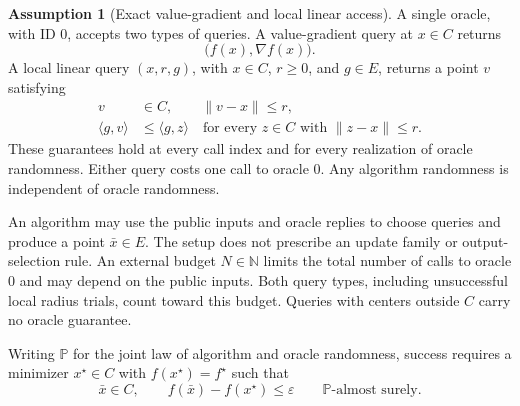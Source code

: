 \documentclass[10pt]{article}
\theoremstyle{definition}
\newtheorem{assumption}{Assumption}
\begin{document}
\begin{assumption}[Exact value-gradient and local linear access]
A single oracle, with ID $0$, accepts two types of queries. A value-gradient query at $x\in C$ returns
\[
\bigl(f(x),\nabla f(x)\bigr).
\]
A local linear query $(x,r,g)$, with $x\in C$, $r\geq0$, and $g\in E$, returns a point $v$ satisfying
\begin{align*}
v&\in C, \qquad \|v-x\|\leq r,\\
\langle g,v\rangle&\leq\langle g,z\rangle
\quad\text{for every }z\in C\text{ with }\|z-x\|\leq r.
\end{align*}
These guarantees hold at every call index and for every realization of oracle randomness. Either query costs one call to oracle $0$. Any algorithm randomness is independent of oracle randomness.
\end{assumption}

An algorithm may use the public inputs and oracle replies to choose queries and produce a point $\bar{x}\in E$. The setup does not prescribe an update family or output-selection rule. An external budget $N\in\mathbb{N}$ limits the total number of calls to oracle $0$ and may depend on the public inputs. Both query types, including unsuccessful local radius trials, count toward this budget. Queries with centers outside $C$ carry no oracle guarantee.

Writing $\mathbb{P}$ for the joint law of algorithm and oracle randomness, success requires a minimizer $x^\star\in C$ with $f(x^\star)=f^\star$ such that
\[
\bar{x}\in C,
\qquad f(\bar{x})-f(x^\star)\leq\varepsilon
\qquad \mathbb{P}\text{-almost surely}.
\]
\end{document}
